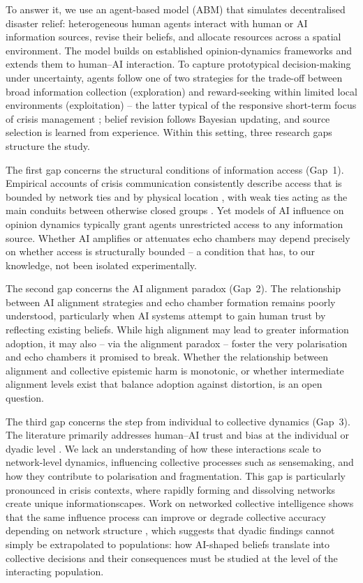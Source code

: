 \documentclass[pdflatex,sn-nature]{sn-jnl}
\begin{document}
To answer it, we use an agent-based model (ABM) that simulates decentralised disaster relief: heterogeneous human agents interact with human or AI information sources, revise their beliefs, and allocate resources across a spatial environment. The model builds on established opinion-dynamics frameworks \citep{deffuant2000mixing,hegselmann2002opinion} and extends them to human--AI interaction. To capture prototypical decision-making under uncertainty, agents follow one of two strategies for the trade-off between broad information collection (exploration) and reward-seeking within limited local environments (exploitation) -- the latter typical of the responsive short-term focus of crisis management \citep{comes2020coordination,march1991exploration}; belief revision follows Bayesian updating, and source selection is learned from experience. Within this setting, three research gaps structure the study.

The first gap concerns the structural conditions of information access (Gap~1). Empirical accounts of crisis communication consistently describe access that is bounded by network ties and by physical location \citep{pan2012crisis,holguin2012unique,wolbers2018introducing}, with weak ties acting as the main conduits between otherwise closed groups \citep{granovetter1973strength}. Yet models of AI influence on opinion dynamics typically grant agents unrestricted access to any information source. Whether AI amplifies or attenuates echo chambers may depend precisely on whether access is structurally bounded -- a condition that has, to our knowledge, not been isolated experimentally.

The second gap concerns the AI alignment paradox (Gap~2). The relationship between AI alignment strategies and echo chamber formation remains poorly understood, particularly when AI systems attempt to gain human trust by reflecting existing beliefs. While high alignment may lead to greater information adoption, it may also -- via the alignment paradox \citep{west2025alignment} -- foster the very polarisation and echo chambers it promised to break. Whether the relationship between alignment and collective epistemic harm is monotonic, or whether intermediate alignment levels exist that balance adoption against distortion, is an open question.

The third gap concerns the step from individual to collective dynamics (Gap~3). The literature primarily addresses human--AI trust and bias at the individual or dyadic level \citep{glikson2020human,glickman2024human}. We lack an understanding of how these interactions scale to network-level dynamics, influencing collective processes such as sensemaking, and how they contribute to polarisation and fragmentation. This gap is particularly pronounced in crisis contexts, where rapidly forming and dissolving networks create unique informationscapes. Work on networked collective intelligence shows that the same influence process can improve or degrade collective accuracy depending on network structure \citep{lorenz2011social,becker2017network}, which suggests that dyadic findings cannot simply be extrapolated to populations: how AI-shaped beliefs translate into collective decisions and their consequences must be studied at the level of the interacting population.
\end{document}
